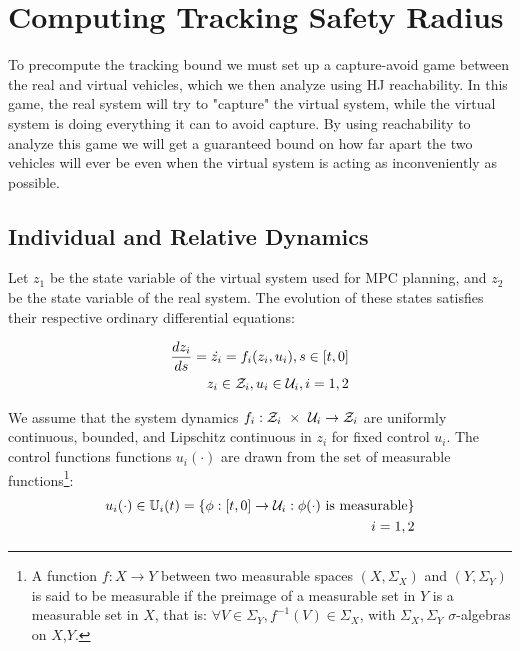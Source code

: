 \section{Computing Tracking Safety Radius \label{sec:reachability}}
To precompute the tracking bound we must set up a capture-avoid game between the real and virtual vehicles, which we then analyze using HJ reachability. In this game, the real system will try to "capture" the virtual system, while the virtual system is doing everything it can to avoid capture. By using reachability to analyze this game we will get a guaranteed bound on how far apart the two vehicles will ever be even when the virtual system is acting as inconveniently as possible.

\subsection{Individual and Relative Dynamics}

Let $z_1$ be the state variable of the virtual system used for MPC planning, and $z_2$ be the state variable of the real system. The evolution of these states satisfies their respective ordinary differential equations:

\begin{equation}
\begin{aligned}
\label{eq:fdyn}
\frac{dz_i}{ds} = \dot{z_i} = f_i(z_i, u_i), s \in [t, 0] \\
z_i \in \mathcal{Z}_i, u_i \in \mathcal{U}_i, i = 1,2
\end{aligned}
\end{equation}

We assume that the system dynamics $f_i : \mathcal{Z}_i\ \times\ \mathcal{U}_i \rightarrow \mathcal{Z}_i$ are uniformly continuous, bounded, and Lipschitz continuous in $z_i$ for fixed control $u_i$. The control functions functions $u_i(\cdot)$ are drawn from the set of measurable functions\footnote{A function $f:X\to Y$ between two measurable spaces $(X,\Sigma_X)$ and $(Y,\Sigma_Y)$ is said to be measurable if the preimage of a measurable set in $Y$ is a measurable set in $X$, that is: $\forall V\in\Sigma_Y, f^{-1}(V)\in\Sigma_X$, with $\Sigma_X,\Sigma_Y$ $\sigma$-algebras on $X$,$Y$.}:
\begin{equation}
\begin{aligned}
u_i(\cdot) \in \mathbb{U}_i(t) = \{\phi: [t, 0] \rightarrow \mathcal{U}_i: \phi(\cdot) \text{ is measurable}\}\\
i = 1,2
\end{aligned}
\end{equation}

